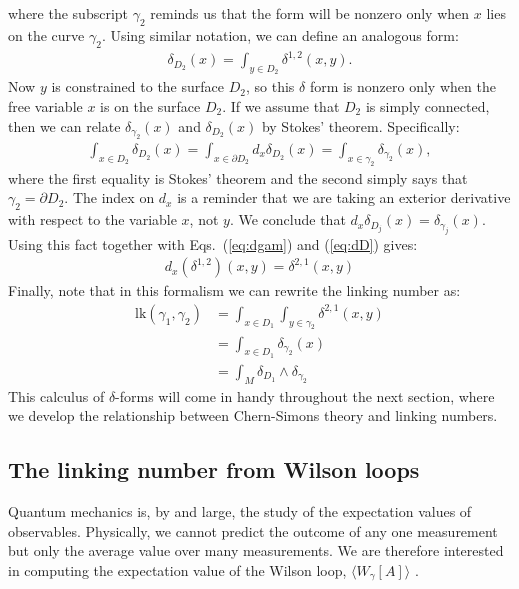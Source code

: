 \documentclass[12pt]{article}
\begin{document}
where the subscript $\gamma_2$ reminds us that the form will be nonzero only when $x$ lies on the curve $\gamma_2$. Using similar notation, we can define an analogous form:
\begin{align}
\delta_{D_2}(x) = \int_{y\in D_2} \delta^{1,2}(x,y).
\label{eq:dD}
\end{align}
Now $y$ is constrained to the surface $D_2$, so this $\delta$ form is nonzero only when the free variable $x$ is on the surface $D_2$. If we assume that $D_2$ is simply connected, then we can relate $\delta_{\gamma_2}(x)$ and $\delta_{D_2}(x)$ by Stokes' theorem. Specifically:
\begin{align*}
\int_{x\in D_2} \delta_{D_2} (x) = \int_{x\in \partial D_2} d_x \delta_{D_2}(x) = \int_{x\in \gamma_2} \delta_{\gamma_2}(x),
\end{align*}
where the first equality is Stokes' theorem and the second simply says that $\gamma_2 = \partial D_2$. The index on $d_x$ is a reminder that we are taking an exterior derivative with respect to the variable $x$, not $y$. We conclude that $d_x \delta_{D_j}(x) = \delta_{\gamma_j} (x)$. Using this fact together with Eqs.~(\ref{eq:dgam}) and (\ref{eq:dD}) gives:
\begin{align*}
d_x (\delta^{1,2})(x,y) = \delta^{2,1} (x,y)
\end{align*}
Finally, note that in this formalism we can rewrite the linking number as:
\begin{align*}
\text{lk}(\gamma_1, \gamma_2) &= \int_{x\in D_1} \int_{y\in \gamma_2} \delta^{2,1} (x,y) \\
	&= \int_{x\in D_1} \delta_{\gamma_2}(x) \\
    &= \int_M \delta_{D_1} \wedge \delta_{\gamma_2}
\end{align*}
This calculus of $\delta$-forms will come in handy throughout the next section, where we develop the relationship between Chern-Simons theory and linking numbers.

\subsection*{The linking number from Wilson loops}

Quantum mechanics is, by and large, the study of the expectation values of observables. Physically, we cannot predict the outcome of any one measurement but only the average value over many measurements. We are therefore interested in computing the expectation value of the Wilson loop, $\langle W_{\gamma}[A]\rangle$ \cite{oldwine}.
\end{document}
